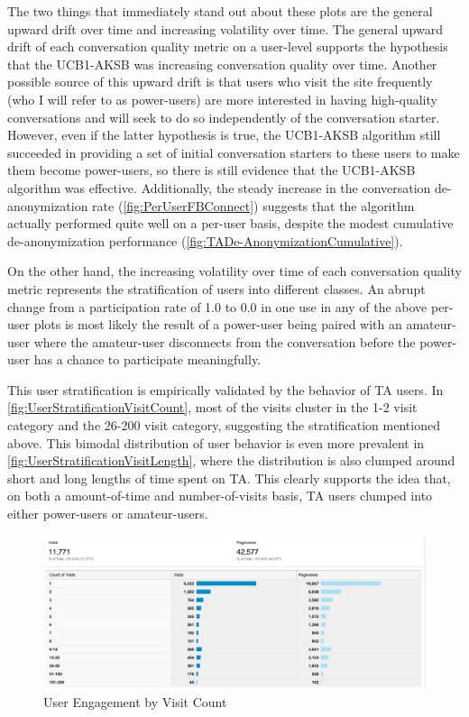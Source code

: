 The two things that immediately stand out about these plots are the general upward drift over time and increasing volatility over time. The general upward drift of each conversation quality metric on a user-level supports the hypothesis that the UCB1-AKSB was increasing conversation quality over time. Another possible source of this upward drift is that users who visit the site frequently (who I will refer to as power-users) are more interested in having high-quality conversations and will seek to do so independently of the conversation starter. However, even if the latter hypothesis is true, the UCB1-AKSB algorithm still succeeded in providing a set of initial conversation starters to these users to make them become power-users, so there is still evidence that the UCB1-AKSB algorithm was effective. Additionally, the steady increase in the conversation de-anonymization rate (\autoref{fig:PerUserFBConnect}) suggests that the algorithm actually performed quite well on a per-user basis, despite the modest cumulative de-anonymization performance (\autoref{fig:TADe-AnonymizationCumulative}).

On the other hand, the increasing volatility over time of each conversation quality metric represents the stratification of users into different classes. An abrupt change from a participation rate of 1.0 to 0.0 in one use in any of the above per-user plots is most likely the result of a power-user being paired with an amateur-user where the amateur-user disconnects from the conversation before the power-user has a chance to participate meaningfully.

This user stratification is empirically validated by the behavior of TA users. In \autoref{fig:UserStratificationVisitCount}, most of the visits cluster in the 1-2 visit category and the 26-200 visit category, suggesting the stratification mentioned above. This bimodal distribution of user behavior is even more prevalent in \autoref{fig:UserStratificationVisitLength}, where the distribution is also clumped around short and long lengths of time spent on TA. This clearly supports the idea that, on both a amount-of-time and number-of-visits basis, TA users clumped into either power-users or amateur-users.

\begin{figure}[H]
\centering
\includegraphics[trim= 0mm 0mm 0mm 0mm, clip, scale=0.3]{./Figures/UserStratificationVisitCount}
\caption{User Engagement by Visit Count}
\label{fig:UserStratificationVisitCount}
\end{figure}

